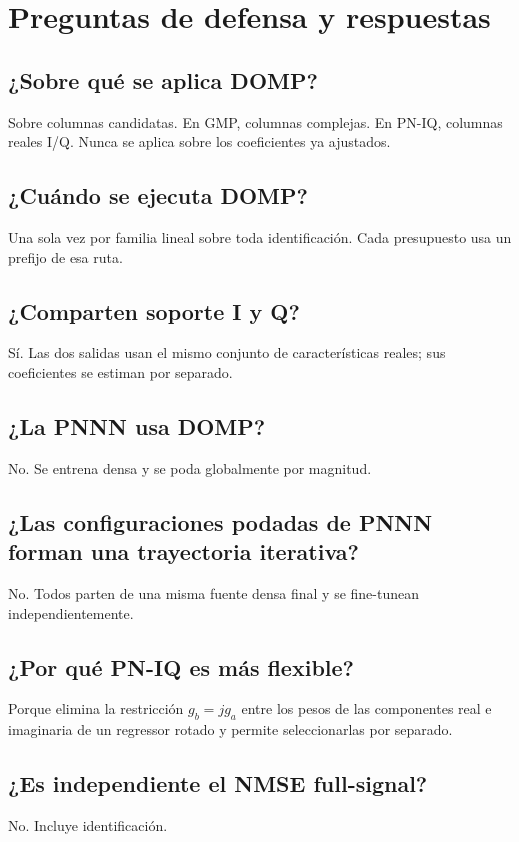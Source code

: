 \documentclass[10pt,a4paper]{article}
\begin{document}
\section{Preguntas de defensa y respuestas}

\subsection*{¿Sobre qué se aplica DOMP?}
Sobre columnas candidatas. En GMP, columnas complejas. En PN-IQ, columnas
reales I/Q. Nunca se aplica sobre los coeficientes ya ajustados.

\subsection*{¿Cuándo se ejecuta DOMP?}
Una sola vez por familia lineal sobre toda identificación. Cada presupuesto
usa un prefijo de esa ruta.

\subsection*{¿Comparten soporte I y Q?}
Sí. Las dos salidas usan el mismo conjunto de características reales; sus
coeficientes se estiman por separado.

\subsection*{¿La PNNN usa DOMP?}
No. Se entrena densa y se poda globalmente por magnitud.

\subsection*{¿Las configuraciones podadas de PNNN forman una trayectoria iterativa?}
No. Todos parten de una misma fuente densa final y se fine-tunean
independientemente.

\subsection*{¿Por qué PN-IQ es más flexible?}
Porque elimina la restricción \(g_b=jg_a\) entre los pesos de las componentes
real e imaginaria de un regressor rotado y permite seleccionarlas por separado.

\subsection*{¿Es independiente el NMSE full-signal?}
No. Incluye identificación.
\end{document}
